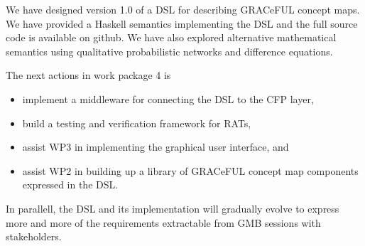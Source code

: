 \documentclass[]{article}
\begin{document}
We have designed version 1.0 of a DSL for describing GRACeFUL concept
maps.
%
We have provided a Haskell semantics implementing the DSL and the full
source code is available on github.
%
We have also explored alternative mathematical semantics using
qualitative probabilistic networks and difference equations.

The next actions in work package 4 is
\begin{itemize}
\item implement a middleware for connecting the DSL to the CFP layer,
\item build a testing and verification framework for RATs,
\item assist WP3 in implementing the graphical user interface, and
\item assist WP2 in building up a library of GRACeFUL concept map
  components expressed in the DSL.
\end{itemize}
%
In parallell, the DSL and its implementation will gradually evolve to
express more and more of the requirements extractable from GMB
sessions with stakeholders.





\end{document}
